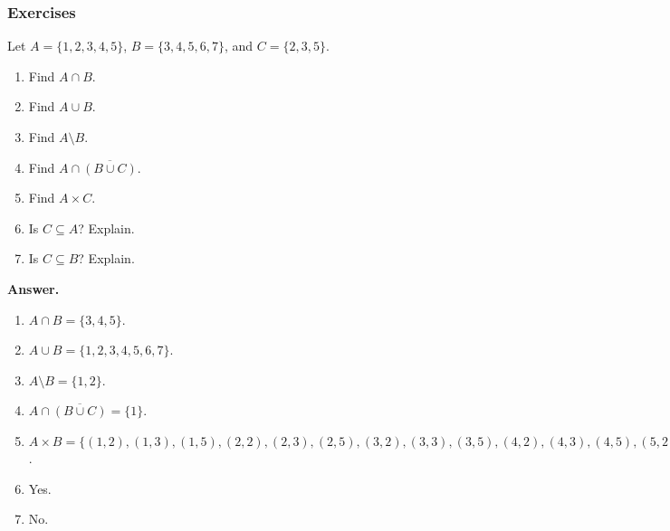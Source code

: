 \documentclass[10pt,]{book}
\theoremstyle{plain}
\theoremstyle{definition}
\theoremstyle{definition}
\theoremstyle{definition}
\numberwithin{equation}{section}
\def\bar{\overline}
\begin{document}
\subsubsection[Exercises]{Exercises}\label{exercises-1}
\begin{exerciselist}
\item[1.]\hypertarget{exercise-1}{}
            Let \(A = \{1,2,3,4,5\}\), \(B = \{3,4,5,6,7\}\), and \(C = \{2,3,5\}\).
\leavevmode%
\begin{enumerate}[label=(\alph*)]
\item\hypertarget{li-118}{}
                Find \(A \cap B\).
\item\hypertarget{li-119}{}
                Find \(A \cup B\).
\item\hypertarget{li-120}{}
                Find \(A \setminus B\).
\item\hypertarget{li-121}{}
                Find \(A \cap \overline{(B \cup C)}\).
\item\hypertarget{li-122}{}
                Find \(A \times C\).
\item\hypertarget{li-123}{}
                Is \(C \subseteq A\)? Explain.
\item\hypertarget{li-124}{}
                Is \(C \subseteq B\)? Explain.
\end{enumerate}
\par\smallskip
\par\smallskip
\noindent\textbf{Answer.}\hypertarget{answer-1}{}\quad
\leavevmode%
\begin{enumerate}[label=(\alph*)]
\item\hypertarget{li-125}{}\(A \cap B = \{3,4,5\}\).\item\hypertarget{li-126}{}\(A \cup B = \{1,2,3,4,5,6,7\}\).\item\hypertarget{li-127}{}\(A \setminus B = \{1,2\}\).\item\hypertarget{li-128}{}\(A \cap \bar{(B \cup C)} = \{1\}\).\item\hypertarget{li-129}{}\(A \times B = \{(1,2), (1,3), (1,5), (2,2), (2,3), (2,5), (3,2), (3,3), (3,5), (4,2), (4,3), (4,5), (5,2), (5,3), (5,5)\}\).\item\hypertarget{li-130}{}
                Yes.
\item\hypertarget{li-131}{}
                No.
\end{enumerate}
\item[2.]\hypertarget{exercise-2}{}

\end{exerciselist}
\end{document}
